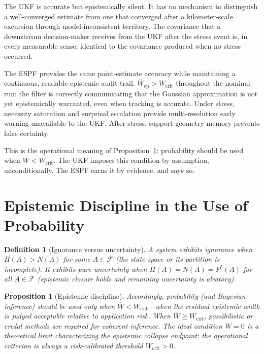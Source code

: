 \documentclass[12pt]{article}
\newtheorem{proposition}[theorem]{Proposition}
\newtheorem{definition}[theorem]{Definition}
\newcommand{\calF}{\mathcal{F}}
\newcommand{\Wcrit}{W_\mathrm{crit}}
\begin{document}
The UKF is accurate but epistemically silent.
It has no mechanism to distinguish a well-converged estimate from one that
converged after a kilometer-scale excursion through model-inconsistent territory.
The covariance that a downstream decision-maker receives from the UKF after the
stress event is, in every measurable sense, identical to the covariance produced
when no stress occurred.

The ESPF provides the same point-estimate accuracy while maintaining a
continuous, readable epistemic audit trail.
$\overline{W}_\mathrm{ep} > W_\mathrm{crit}$ throughout the nominal run:
the filter is correctly communicating that the Gaussian approximation is not
yet epistemically warranted, even when tracking is accurate.
Under stress, necessity saturation and surprisal escalation provide
multi-resolution early warning unavailable to the UKF.
After stress, support-geometry memory prevents false certainty.

This is the operational meaning of Proposition~\ref{prop:discipline}:
probability should be used when $\overline{W} < W_\mathrm{crit}$.
The UKF imposes this condition by assumption, unconditionally.
The ESPF earns it by evidence, and says so.

\section{Epistemic Discipline in the Use of Probability}
\label{sec:discipline}

\begin{definition}[Ignorance versus uncertainty]
A system exhibits \emph{ignorance} when $\Pi(A)>N(A)$ for some $A\in\calF$
(the state space or its partition is incomplete).
It exhibits \emph{pure uncertainty} when $\Pi(A)=N(A)=P^*(A)$ for all
$A\in\calF$ (epistemic closure holds and remaining uncertainty is aleatory).
\end{definition}

\begin{proposition}[Epistemic discipline]
\label{prop:discipline}
Accordingly, probability (and Bayesian inference) should be used only when
$\overline{W}<\Wcrit$---when the residual epistemic width is judged acceptable
relative to application risk.
When $\overline{W}\ge\Wcrit$, possibilistic or credal methods are required for
coherent inference.
The ideal condition $W=0$ is a theoretical limit characterizing the
epistemic collapse endpoint; the operational criterion is always a risk-calibrated
threshold $\Wcrit>0$.
\end{proposition}
\end{document}
